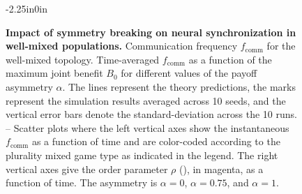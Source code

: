 \documentclass[10pt,letterpaper]{article}
\begin{document}
\begin{figure}
\begin{adjustwidth}{-2.25in}{0in}
  \centering
  \begin{subcaptiongroup}
      {\label{fig:time-series_well-mixed_alpha-1}\captiontext*{}}{%
      {\label{fig:time-series_well-mixed_alpha-075}\captiontext*{}}{%
      {\label{fig:time-series_well-mixed_alpha-0}\captiontext*{}}{%
      {\label{fig:multi-comm-frac}\captiontext*{}}{%
    {}%
  }}}}
  \end{subcaptiongroup}
  \caption{
    \textbf{
      Impact of symmetry breaking on neural synchronization
      in well-mixed populations.
    }
    Communication frequency $f_{\text{comm}}$ for the well-mixed topology.
    Time-averaged $f_{\text{comm}}$ as a function
    of the maximum joint benefit $B_0$
    for different values of the payoff asymmetry $\alpha$.
    The lines represent the theory predictions,
		the marks represent the simulation results averaged across 10 seeds,
		and the vertical error bars denote the standard-deviation across the
		10 runs.
    --
    Scatter plots where
    the left vertical axes show the instantaneous $f_{\text{comm}}$
    as a function of time and are color-coded according
    to the plurality mixed game type as indicated in the legend.
    The right vertical axes give the order parameter $\rho$
    (), in magenta, as a function of time.
    The asymmetry is
    $\alpha = 0$,
    $\alpha = 0.75$,
    and
    $\alpha = 1$.
  }\label{fig:well-mixed}
\end{adjustwidth}
\end{figure}
\end{document}
